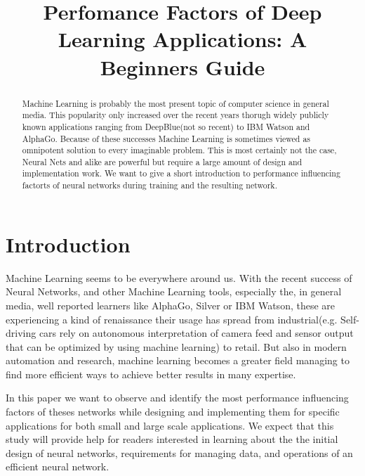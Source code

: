 \documentclass[conference]{IEEEtran}
\begin{document}
\title{
Perfomance Factors of Deep Learning Applications: A Beginners Guide
}

\author{
}

\begin{abstract}

Machine Learning is probably the most present topic of computer science in general media. This popularity only increased over the recent years thorugh widely publicly known applications ranging from DeepBlue(not so recent) to IBM Watson and AlphaGo. Because of these successes Machine Learning is sometimes viewed as omnipotent solution to every imaginable problem. This is most certainly not the case, Neural Nets and alike are powerful but require a large amount of design and implementation work. We want to give a short introduction to performance influencing factorts of neural networks during training and the resulting network.

\end{abstract}

\IEEEpeerreviewmaketitle
\section{Introduction}
Machine Learning seems to be everywhere around us. With the recent success of Neural Networks, and other Machine Learning tools, especially the, in general media, well reported learners like AlphaGo, Silver or IBM Watson, these are experiencing a kind of renaissance their usage has spread from industrial(e.g. Self-driving cars rely on autonomous interpretation of camera feed and sensor output that can be optimized by using machine learning) to retail. But also in modern automation and research, machine learning becomes a greater field managing to find more efficient ways to achieve better results in many expertise.

In this paper we want to observe and identify the most performance influencing factors of theses networks while designing and implementing them for specific applications for both small and large scale applications.
We expect that this study will provide help for readers interested in learning about the the initial design of neural networks, requirements for managing data, and operations of an efficient neural network.
\end{document}
